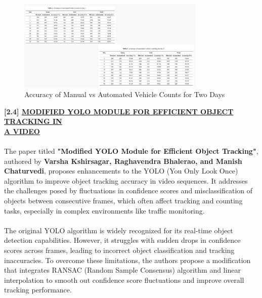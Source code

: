 {%
\begin{figure}[h!]
    \centering
    \includegraphics[width=0.8\textwidth]{images/Paper 3 Result.png}
    \caption{Accuracy of Manual vs Automated Vehicle Counts for Two Days}
\end{figure}
%
%
\newpage
\noindent
{\textbf{[2.4] \underline{MODIFIED YOLO MODULE FOR EFFICIENT OBJECT TRACKING IN} \\ \underline{A VIDEO}}}\\\\
%
The paper titled \textbf{"Modified YOLO Module for Efficient Object Tracking"}, authored by \textbf{Varsha Kshirsagar, Raghavendra Bhalerao, and Manish Chaturvedi}, proposes enhancements to the YOLO (You Only Look Once) algorithm to improve object tracking accuracy in video sequences. It addresses the challenges posed by fluctuations in confidence scores and misclassification of objects between consecutive frames, which often affect tracking and counting tasks, especially in complex environments like traffic monitoring.\\\\
%
The original YOLO algorithm is widely recognized for its real-time object detection capabilities. However, it struggles with sudden drops in confidence scores across frames, leading to incorrect object classification and tracking inaccuracies. To overcome these limitations, the authors propose a modification that integrates RANSAC (Random Sample Consensus) algorithm and linear interpolation to smooth out confidence score fluctuations and improve overall tracking performance.
%
%
\begin{figure}[h!]
    \centering

\end{figure}}
